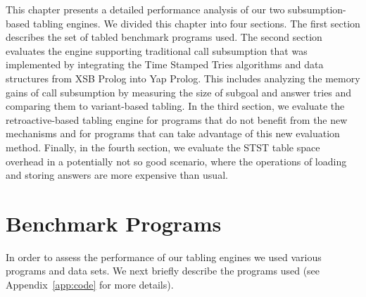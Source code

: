 This chapter presents a detailed performance analysis of our two subsumption-based tabling engines.
We divided this chapter into four sections. The first section describes the
set of tabled benchmark programs used. The second
section evaluates the engine supporting traditional call subsumption that was implemented by integrating the
Time Stamped Tries algorithms and data structures from XSB Prolog into Yap Prolog. This includes analyzing the memory gains
of call subsumption by measuring the size of subgoal and answer tries and comparing them to variant-based tabling.
In the third section, we evaluate the retroactive-based tabling engine for programs that do not benefit
from the new mechanisms and for programs that can take advantage of this new evaluation method. Finally,
in the fourth section, we evaluate the STST table space overhead in a potentially not so good scenario,
where the operations of loading and storing answers are more expensive than usual.

\section{Benchmark Programs}

In order to assess the performance of our tabling engines we used various programs and data sets.
We next briefly describe the programs used (see Appendix~\ref{app:code} for more details).

